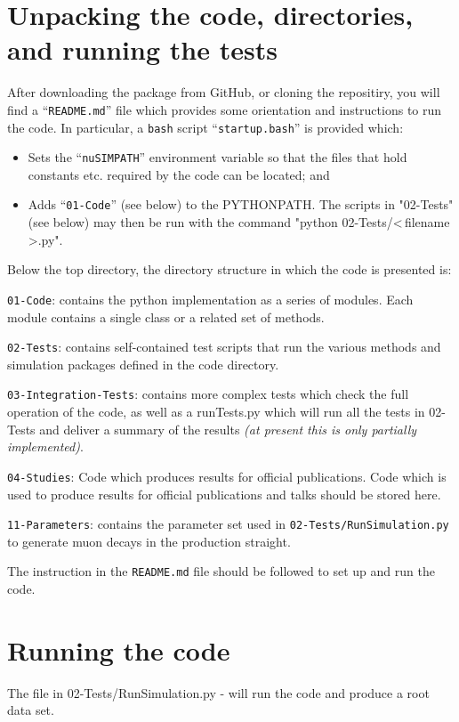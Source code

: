 \section*{Unpacking the code, directories, and running the tests}
After downloading the package from GitHub, or cloning the repositiry,
you will find a ``\verb+README.md+'' file which provides some orientation
and instructions to run the code.
In particular, a \verb+bash+ script ``\verb+startup.bash+'' is
provided which:
\begin{itemize}
  \item Sets the ``\verb+nuSIMPATH+'' environment variable so that the
    files that hold constants etc. required by the code can be
    located; and
  \item Adds ``\verb+01-Code+'' (see below) to the PYTHONPATH.
    The scripts in "02-Tests" (see below) may then be run with the
    command "python 02-Tests/\textless\,filename\,\textgreater.py".
\end{itemize}
Below the top directory, the directory structure in which the code is
presented is:
\begin{description}
  \item\verb+01-Code+: contains the python implementation as a
    series of modules.
    Each module contains a single class or a related set of methods.
  \item\verb+02-Tests+: contains self-contained test scripts that
    run the various methods and simulation packages defined in the
    code directory.
  \item\verb+03-Integration-Tests+: contains more complex tests which check
    the full operation of the code, as well as a runTests.py which will run all the
    tests in 02-Tests and deliver a summary of the results {\it (at present this is only
    partially implemented)}.
  \item\verb+04-Studies+: Code which produces results for official publications. Code which is
   used to produce results for official publications and talks should be stored here.
  \item\verb+11-Parameters+: contains the parameter set used in
    \verb+02-Tests/RunSimulation.py+ to generate muon decays in
    the production straight.
\end{description}
The instruction in the \verb+README.md+ file should be followed to set
up and run the code.

\section{Running the code}
The file in 02-Tests/RunSimulation.py - will run the code and produce a root data  set.\newline

